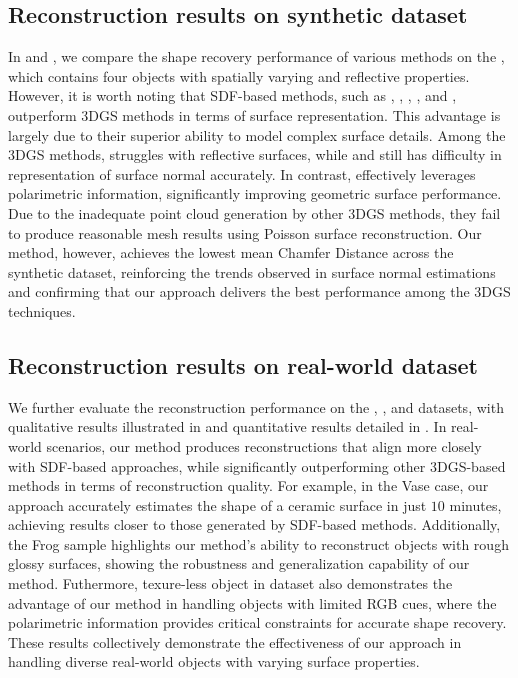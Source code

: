 \subsection{Reconstruction results on synthetic dataset}

In  and , we compare the shape recovery performance of various methods on the \smvp, which contains four objects with spatially varying and reflective properties. However, it is worth noting that SDF-based methods, such as \nero, \gsror, \mvas, \pandora, and \nersp, outperform 3DGS methods in terms of surface representation. This advantage is largely due to their superior ability to model complex surface details. Among the 3DGS methods, \gs struggles with reflective surfaces, while \dr and \relight still has difficulty in representation of surface normal accurately.
In contrast, \polgs effectively leverages polarimetric information, significantly improving geometric surface performance. Due to the inadequate point cloud generation by other 3DGS methods, they fail to produce reasonable mesh results using Poisson surface reconstruction. Our method, however, achieves the lowest mean Chamfer Distance across the synthetic \smvp dataset, reinforcing the trends observed in surface normal estimations and confirming that our approach delivers the best performance among the 3DGS techniques.

\subsection{Reconstruction results on real-world dataset}
We further evaluate the reconstruction performance on the \pandora, \rmvp,  and \pisr datasets, with qualitative results illustrated in  and quantitative results detailed in . In real-world scenarios, our method produces reconstructions that align more closely with SDF-based approaches, while significantly outperforming other 3DGS-based methods in terms of reconstruction quality. For example, in the {\sc Vase} case, our approach accurately estimates the shape of a ceramic surface in just $10$ minutes, achieving results closer to those generated by SDF-based methods. 
Additionally, the {\sc Frog} sample highlights our method's ability to reconstruct objects with rough glossy surfaces, showing the robustness and generalization capability of our method. 
Futhermore, texure-less object in \pisr dataset also demonstrates the advantage of our method in handling objects with limited RGB cues, where the polarimetric information provides critical constraints for accurate shape recovery.
These results collectively demonstrate the effectiveness of our approach in handling diverse real-world objects with varying surface properties. 




